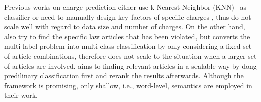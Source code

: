 Previous works on charge prediction either use k-Nearest Neighbor (KNN)~\cite{LIU2004case,liu2006exploring} as classifier or need to manually design key factors of specific charges \cite{lin2012exploiting}, thus do not scale well with regard to data size and number of charges. On the other hand, \cite{liu2005classifying,liu2006exploring} also try to find the specific law articles that has been violated, but converts the multi-label problem into multi-class classification by only considering a fixed set of article combinations, therefore does not scale to the situation when a larger set of articles are involved. \cite{liu2015predicting} aims to finding relevant articles in a scalable way by dong predilinary classification first and rerank the results afterwards. Although the framework is promising, only shallow, i.e., word-level, semantics are employed in their work. 




